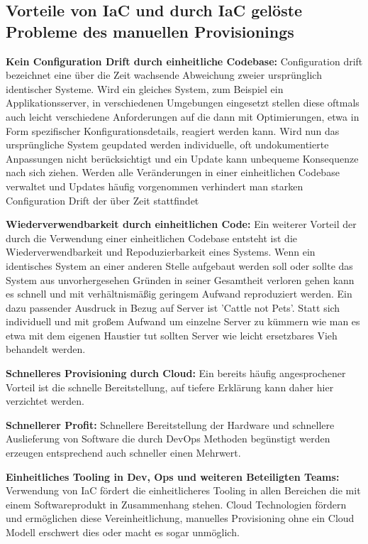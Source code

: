 \subsection{Vorteile von IaC und durch IaC gelöste Probleme des
manuellen Provisionings}

\textbf{Kein Configuration Drift durch einheitliche Codebase:}
Configuration drift bezeichnet eine über die Zeit
wachsende Abweichung zweier ursprünglich identischer Systeme. Wird ein
gleiches System, zum Beispiel ein Applikationsserver, in verschiedenen
Umgebungen eingesetzt stellen diese oftmals auch leicht verschiedene
Anforderungen auf die dann mit Optimierungen, etwa in Form spezifischer
Konfigurationsdetails, reagiert werden kann. Wird nun das ursprüngliche
System geupdated werden individuelle, oft undokumentierte Anpassungen
nicht berücksichtigt und ein Update kann unbequeme Konsequenze nach
sich ziehen. Werden alle Veränderungen in einer einheitlichen
Codebase verwaltet und Updates häufig vorgenommen verhindert man
starken Configuration Drift der über Zeit stattfindet

\textbf{Wiederverwendbarkeit durch einheitlichen Code:}
Ein weiterer Vorteil der durch die Verwendung einer einheitlichen
Codebase entsteht ist die Wiederverwendbarkeit und Repoduzierbarkeit
eines Systems. Wenn ein identisches System an einer anderen Stelle
aufgebaut werden soll oder sollte das System aus unvorhergesehen
Gründen in seiner Gesamtheit verloren gehen kann es schnell und mit
verhältnismäßig geringem Aufwand reproduziert werden.
Ein dazu passender Ausdruck in Bezug auf Server ist 'Cattle not Pets'.
Statt sich individuell und mit großem Aufwand um einzelne Server zu
kümmern wie man es etwa mit dem eigenen Haustier tut sollten Server
wie leicht ersetzbares Vieh behandelt werden.

\textbf{Schnelleres Provisioning durch Cloud:} Ein bereits häufig
angesprochener Vorteil ist die schnelle Bereitstellung, auf tiefere
Erklärung kann daher hier verzichtet werden.

\textbf{Schnellerer Profit:} Schnellere Bereitstellung der Hardware
und schnellere Auslieferung von Software die durch DevOps Methoden
begünstigt werden erzeugen entsprechend auch schneller einen Mehrwert.

\textbf{Einheitliches Tooling in Dev, Ops und weiteren Beteiligten Teams:}
Verwendung von IaC
fördert die einheitlicheres Tooling in allen Bereichen die mit einem
Softwareprodukt in Zusammenhang stehen. Cloud Technologien fördern und
ermöglichen diese Vereinheitlichung, manuelles Provisioning ohne ein
Cloud Modell erschwert dies oder macht es sogar unmöglich.

